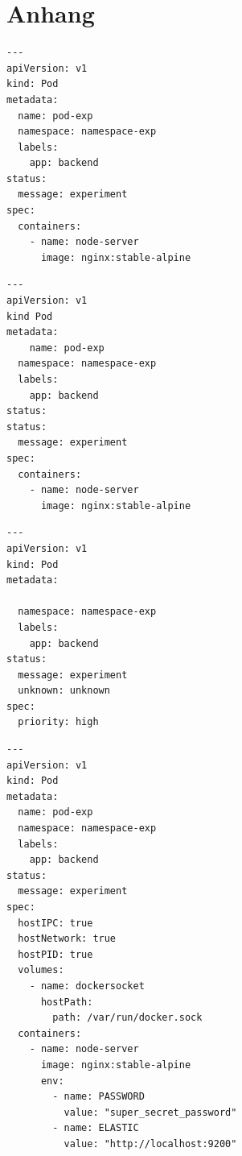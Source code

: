 \chapter{Anhang}\label{ch:appendix}

\begin{listing}[htp]
  \begin{verbatim}
---
apiVersion: v1
kind: Pod
metadata:
  name: pod-exp
  namespace: namespace-exp
  labels:
    app: backend  
status:
  message: experiment
spec: 
  containers:
    - name: node-server
      image: nginx:stable-alpine
    \end{verbatim}
  \caption{pod.yaml auf Cluster ausgerollt}
  \label{lst:pod-yaml-file}
\end{listing}

\begin{listing}[htp]
  \begin{verbatim}
---
apiVersion: v1
kind Pod
metadata:
    name: pod-exp
  namespace: namespace-exp
  labels:
    app: backend
status:    
status:
  message: experiment
spec:
  containers:
    - name: node-server
      image: nginx:stable-alpine
    \end{verbatim}
  \caption{pod.yaml für Testfälle der Herausforderung 1}
  \label{lst:pod-yaml-file-1}
\end{listing}

\begin{listing}[htp]
  \begin{verbatim}
---
apiVersion: v1
kind: Pod
metadata:
  
  namespace: namespace-exp
  labels:
    app: backend
status:    
  message: experiment
  unknown: unknown  
spec:
  priority: high
    \end{verbatim}
  \caption{pod.yaml für Testfälle der Herausforderung 2}
  \label{lst:pod-yaml-file-2}
\end{listing}

\begin{listing}[htp]
  \begin{verbatim}
---
apiVersion: v1
kind: Pod
metadata:
  name: pod-exp
  namespace: namespace-exp
  labels:
    app: backend
status:    
  message: experiment 
spec:
  hostIPC: true
  hostNetwork: true
  hostPID: true
  volumes:
    - name: dockersocket
      hostPath:
        path: /var/run/docker.sock
  containers:
    - name: node-server
      image: nginx:stable-alpine
      env:
        - name: PASSWORD
          value: "super_secret_password"
        - name: ELASTIC
          value: "http://localhost:9200"
  \end{verbatim}
  \caption{pod.yaml für Testfälle der Herausforderung 3 - Version 1}
  \label{lst:pod-yaml-file-3-1}
\end{listing}


